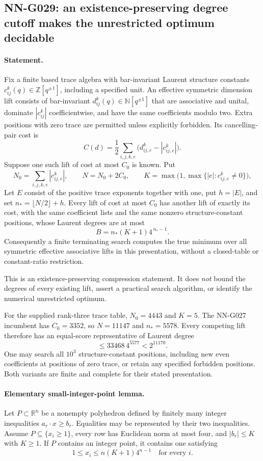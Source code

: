 \subsection{NN-G029: an existence-preserving degree cutoff makes the unrestricted optimum decidable}
\paragraph{Statement.}
Fix a finite based trace algebra with bar-invariant Laurent
structure constants $c_{ij}^k(q)\in\mathbb Z[q^{\pm1}]$,
including a specified unit. An effective symmetric dimension
lift consists of bar-invariant $d_{ij}^k(q)\in\mathbb N[q^{\pm1}]$
that are associative and unital, dominate $|c_{ij}^k|$
coefficientwise, and have the same coefficients modulo two.
Extra positions with zero trace are permitted unless explicitly
forbidden. Its cancelling-pair cost is
\[
 C(d)=\frac12\sum_{i,j,k,e}
             \bigl(d_{ij,e}^k-|c_{ij,e}^k|\bigr).
\]
Suppose one such lift of cost at most $C_0$ is known.
Put
\[
 N_0=\sum_{i,j,k,e}|c_{ij,e}^k|,\qquad N=N_0+2C_0,
 \qquad K=\max\bigl(1,\max\{|e|:c_{ij,e}^k\ne0\}\bigr),
\]
Let $E$ consist of the positive trace exponents together with one,
put $h=|E|$, and set $n_* =\lfloor N/2\rfloor+h$.
Every lift of cost at most $C_0$ has another lift of exactly
its cost, with the same coefficient lists and the same nonzero
structure-constant positions, whose Laurent degrees are at most
\[
 B=n_*(K+1)4^{\,n_*-1}.                              \tag{G029.1}
\]
Consequently a finite terminating search computes the true
minimum over all symmetric effective associative lifts in
this presentation, without a closed-table or constant-ratio
restriction.

This is an existence-preserving compression statement.
It does \emph{not} bound the degrees of every existing lift,
assert a practical search algorithm, or identify the numerical
unrestricted optimum.

For the supplied rank-three trace table, $N_0=4443$ and $K=5$.
The NN-G027 incumbent has $C_0=3352$, so $N=11147$ and
$n_*=5578$. Every competing lift therefore has an equal-score
representative of Laurent degree
\[
 \le33468\,4^{5577}<2^{11170}.                       \tag{G029.2}
\]
One may search all $10^3$ structure-constant positions, including
new even coefficients at positions of zero trace, or retain any
specified forbidden positions. Both variants are finite and
complete for their stated presentation.

\paragraph{Elementary small-integer-point lemma.}
Let $P\subset\mathbb R^n$ be a nonempty polyhedron defined by
finitely many integer inequalities $a_r\cdot x\ge b_r$.
Equalities may be represented by their two inequalities.
Assume $P\subseteq\{x_i\ge1\}$, every row has Euclidean
norm at most four, and $|b_r|\le K$ with $K\ge1$.
If $P$ contains an integer point, it contains one satisfying
\[
 1\le x_i\le n(K+1)4^{n-1}\quad\text{for every }i.
 \tag{G029.3}
\]

